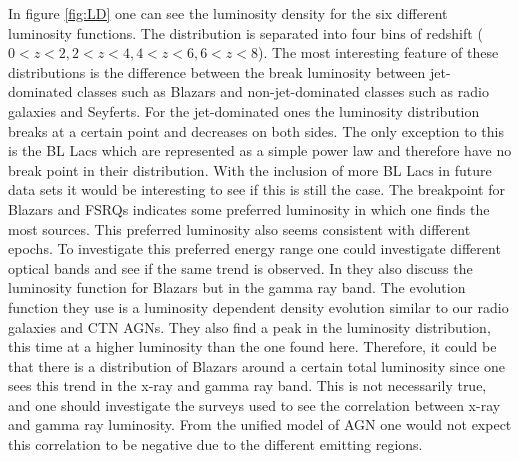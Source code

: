In figure \ref{fig:LD} one can see the luminosity density for the six different luminosity functions. The distribution is 
separated into four bins of redshift ($0<z<2,2<z<4,4<z<6,6<z<8$). %
The most interesting feature of these distributions is the difference between the break luminosity between jet-dominated classes such as Blazars and non-jet-dominated classes such as radio galaxies and Seyferts.
For the jet-dominated ones the luminosity distribution breaks at a certain point and decreases on both sides. The only exception to this is the BL Lacs which are represented as a simple power law and therefore have no
break point in their distribution. With the inclusion of more BL Lacs in future data sets it would be interesting to see if this is still the case. %
The breakpoint for Blazars and FSRQs indicates some preferred 
luminosity in which one finds the most sources. This preferred luminosity also seems consistent with different epochs. To investigate this preferred energy range one could investigate different optical bands and see if the same trend is observed. 
In \cite{Narumoto_2006} they also discuss the luminosity function for Blazars but in the gamma ray band. The evolution function they use is a luminosity dependent density evolution similar to our radio galaxies and CTN AGNs. They also find a peak in the luminosity distribution, this time at a higher luminosity than the one found here.
Therefore, it could be that there is a distribution of Blazars around a certain total luminosity since one sees this trend in the x-ray and gamma ray band. 
This is not necessarily true, and one should investigate the surveys used to see the correlation between x-ray and gamma ray luminosity. \colorbox{BurntOrange}{ From the unified model of AGN one would not expect this correlation to be negative due to the different emitting regions.}



